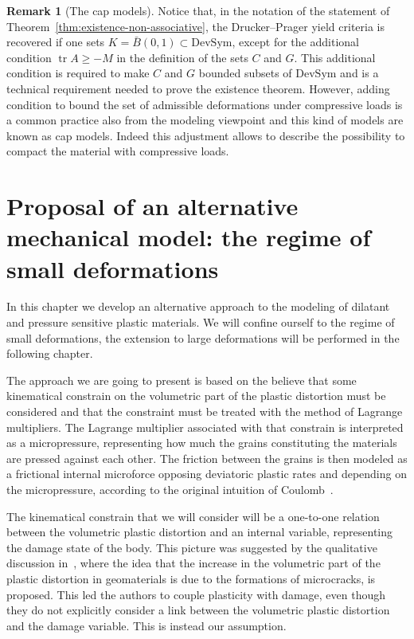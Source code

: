 \documentclass[a4paper,10pt,oneside]{amsbook}
\numberwithin{section}{chapter}
\numberwithin{equation}{chapter}
\theoremstyle{definition}
\newtheorem{rmk}[prop]{Remark}
\DeclareMathOperator{\tr}{tr}
\begin{document}
\begin{rmk}[The cap models]
Notice that, in the notation of the statement of Theorem~\ref{thm:existence-non-associative}, the Drucker--Prager yield criteria is recovered if one sets $K=\bar B(0,1)\subset\text{DevSym}$, except for the additional condition $\tr A\ge-M$ in the definition of the sets $C$ and $G$. This additional condition is required to make $C$ and $G$ bounded subsets of $\text{DevSym}$ and is a technical requirement needed to prove the existence theorem. However, adding condition to bound the set of admissible deformations under compressive loads is a common practice also from the modeling viewpoint and this kind of models are known as cap models. Indeed this adjustment allows to describe the possibility to compact the material with compressive loads.
\end{rmk}

\chapter{Proposal of an alternative mechanical model: the regime of small deformations}
\label{chap:pressure-sensitive-small}

In this chapter we develop an alternative approach to the modeling of dilatant and pressure sensitive plastic materials. We will confine ourself to the regime of small deformations, the extension to large deformations will be performed in the following chapter.

The approach we are going to present is based on the believe that some kinematical constrain on the volumetric part of the plastic distortion must be considered and that the constraint must be treated with the method of Lagrange multipliers. The Lagrange multiplier associated with that constrain is interpreted as a micropressure, representing how much the grains constituting the materials are pressed against each other. The friction between the grains is then modeled as a frictional internal microforce opposing deviatoric plastic rates and depending on the micropressure, according to the original intuition of Coulomb~\cite{Coulomb1776}.

The kinematical constrain that we will consider will be a one-to-one relation between the volumetric plastic distortion and an internal variable, representing the damage state of the body. This picture was suggested by the qualitative discussion in~\cite{micro-geo}, where the idea that the increase in the volumetric part of the plastic distortion in geomaterials is due to the formations of microcracks, is proposed. This led the authors to couple plasticity with damage, even though they do not explicitly consider a link between the volumetric plastic distortion and the damage variable. This is instead our assumption.
\end{document}
